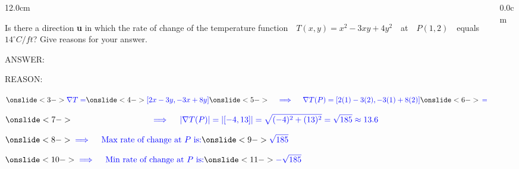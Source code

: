 \begin{frame}
\begin{columns}\begin{column}{12.0cm}

\vspace{0.1cm}

\scriptsize	

\EX Is there a direction {\bf u} in which the rate of change of the temperature function \,\, $T(x,y) = x^2 - 3xy + 4y^2$ \,\, at \,\, $P(1, 2)$ \,\,  equals \,\,  $14^{\circ} C/ft$? Give reasons for your answer.
	
	\vspace{0.2cm}
	
ANSWER: 

\vspace{0.2cm}

REASON: 

\vspace{0.2cm}

$\D{
\ON<3->{\B{\nabla T = }}
\ON<4->{\B{[2x-3y,-3x+8y]}}
\ON<5->{\B{ \quad \implies \quad \nabla T(P) = [2(1)-3(2),-3(1)+8(2)]}}
\ON<6->{\B{\,= [-4,13]}}
}$

\vspace{0.2cm}

$\D{
\ON<7->{\B{ \hspace{2.6cm} \qquad \implies \quad |\nabla T(P)| = |[-4,13]| = \sqrt{(-4)^2 + (13)^2} = \sqrt{185} \approx 13.6}}
}$

\vspace{0.5cm}

$\D{
\ON<8->{\B{\implies \quad \text{Max rate of change at $P$ is:}}}
\ON<9->{\B{\sqrt{185}}}}$

\vspace{0.5cm}

$\D{
\ON<10->{\B{\implies \quad \text{Min rate of change at $P$ is:}}}
\ON<11->{\B{-\sqrt{185}}}}$

\vspace{0.5cm}



\vspace{4.2cm}

\end{column}\begin{column}{0.0cm}\end{column}\end{columns}
\end{frame}

